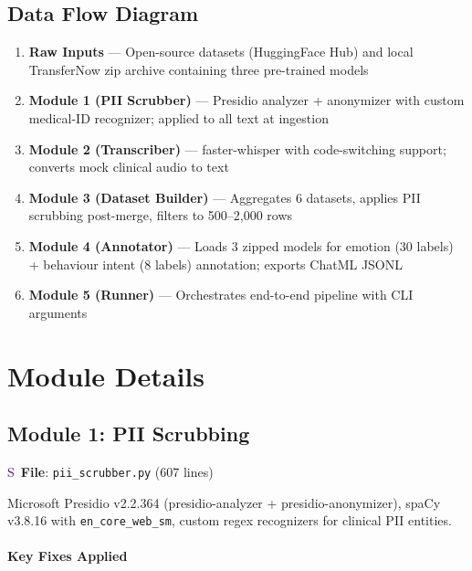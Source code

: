 \documentclass[11pt,a4paper]{article}
\begin{document}
\subsection{Data Flow Diagram}

\begin{enumerate}[label=$\rightarrow$\ \arabic*., leftmargin=*, itemsep=0.5em]
\item \textbf{Raw Inputs} --- Open-source datasets (HuggingFace Hub) and local TransferNow zip archive containing three pre-trained models
\item \textbf{Module 1 (PII Scrubber)} --- Presidio analyzer + anonymizer with custom medical-ID recognizer; applied to all text at ingestion
\item \textbf{Module 2 (Transcriber)} --- faster-whisper with code-switching support; converts mock clinical audio to text
\item \textbf{Module 3 (Dataset Builder)} --- Aggregates 6 datasets, applies PII scrubbing post-merge, filters to 500--2{,}000 rows
\item \textbf{Module 4 (Annotator)} --- Loads 3 zipped models for emotion (30 labels) + behaviour intent (8 labels) annotation; exports ChatML JSONL
\item \textbf{Module 5 (Runner)} --- Orchestrates end-to-end pipeline with CLI arguments
\end{enumerate}

\section{Module Details}

\subsection{Module 1: PII Scrubbing}
\textcolor{indigo}{\textsf{S}}\ \textbf{File}: \texttt{pii_scrubber.py} (607 lines)

\begin{tcolorbox}[infoBox={Technology Stack}]
Microsoft Presidio v2.2.364 (presidio-analyzer + presidio-anonymizer), spaCy v3.8.16 with \texttt{en\_core\_web\_sm}, custom regex recognizers for clinical PII entities.
\end{tcolorbox}

\paragraph{Key Fixes Applied}
\end{document}
